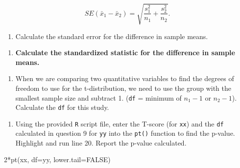 \documentclass[
]{report}
\newenvironment{Shaded}{\begin{snugshade}}{\end{snugshade}}
\newcommand{\AttributeTok}[1]{\textcolor[rgb]{0.77,0.63,0.00}{#1}}
\newcommand{\ConstantTok}[1]{\textcolor[rgb]{0.00,0.00,0.00}{#1}}
\newcommand{\DecValTok}[1]{\textcolor[rgb]{0.00,0.00,0.81}{#1}}
\newcommand{\FunctionTok}[1]{\textcolor[rgb]{0.00,0.00,0.00}{#1}}
\newcommand{\NormalTok}[1]{#1}
\newcommand{\SpecialCharTok}[1]{\textcolor[rgb]{0.00,0.00,0.00}{#1}}
\providecommand{\tightlist}{%
  \setlength{\itemsep}{0pt}\setlength{\parskip}{0pt}}
\begin{document}
\[SE(\bar{x}_1 -\bar{x}_2)=\sqrt{\frac{s_1^2}{n_1}+\frac{s_2^2}{n_2}}.\]

\begin{enumerate}
\def\labelenumi{\arabic{enumi}.}
\setcounter{enumi}{6}
\tightlist
\item
  Calculate the standard error for the difference in sample means.
\end{enumerate}

\vspace{0.5in}
\newpage

\begin{enumerate}
\def\labelenumi{\arabic{enumi}.}
\setcounter{enumi}{7}
\tightlist
\item
  \textbf{Calculate the standardized statistic for the difference in sample means.}
\end{enumerate}

\vspace{0.5in}

\begin{enumerate}
\def\labelenumi{\arabic{enumi}.}
\setcounter{enumi}{8}
\tightlist
\item
  When we are comparing two quantitative variables to find the degrees of freedom to use for the t-distribution, we need to use the group with the smallest sample size and subtract 1. (\texttt{df} = minimum of \(n_1 - 1\) or \(n_2 - 1\)). Calculate the \texttt{df} for this study.
\end{enumerate}

\vspace{0.2in}

\begin{enumerate}
\def\labelenumi{\arabic{enumi}.}
\setcounter{enumi}{9}
\tightlist
\item
  Using the provided \texttt{R} script file, enter the T-score (for \texttt{xx}) and the \texttt{df} calculated in question 9 for \texttt{yy} into the \texttt{pt()} function to find the p-value. Highlight and run line 20. Report the p-value calculated.
\end{enumerate}

\begin{Shaded}
\begin{Highlighting}[]
\DecValTok{2}\SpecialCharTok{*}\FunctionTok{pt}\NormalTok{(xx, }\AttributeTok{df=}\NormalTok{yy, }\AttributeTok{lower.tail=}\ConstantTok{FALSE}\NormalTok{)}
\end{Highlighting}
\end{Shaded}

\vspace{0.2in}
\end{document}
